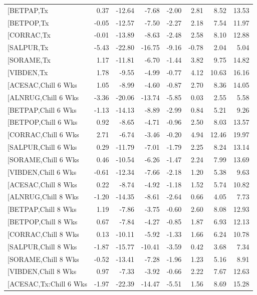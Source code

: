 \documentclass{article}\usepackage[]{graphicx}\usepackage[]{color}
\begin{document}
\begin{longtable}{lrrrrrrr}
  [BETPAP,Tx & 0.37 & -12.64 & -7.68 & -2.00 & 2.81 & 8.52 & 13.53 \\ 
  [BETPOP,Tx & -0.05 & -12.57 & -7.50 & -2.27 & 2.18 & 7.54 & 11.97 \\ 
  [CORRAC,Tx & -0.01 & -13.89 & -8.63 & -2.48 & 2.58 & 8.10 & 12.88 \\ 
  [SALPUR,Tx & -5.43 & -22.80 & -16.75 & -9.16 & -0.78 & 2.04 & 5.04 \\ 
  [SORAME,Tx & 1.17 & -11.81 & -6.70 & -1.44 & 3.82 & 9.75 & 14.82 \\ 
  [VIBDEN,Tx & 1.78 & -9.55 & -4.99 & -0.77 & 4.12 & 10.63 & 16.16 \\ 
  [ACESAC,Chill 6 Wks & 1.05 & -8.99 & -4.60 & -0.87 & 2.70 & 8.36 & 14.05 \\ 
  [ALNRUG,Chill 6 Wks & -3.36 & -20.06 & -13.74 & -5.85 & 0.03 & 2.55 & 5.58 \\ 
  [BETPAP,Chill 6 Wks & -1.13 & -14.13 & -8.89 & -2.99 & 0.84 & 5.21 & 9.26 \\ 
  [BETPOP,Chill 6 Wks & 0.92 & -8.65 & -4.71 & -0.96 & 2.50 & 8.03 & 13.57 \\ 
  [CORRAC,Chill 6 Wks & 2.71 & -6.74 & -3.46 & -0.20 & 4.94 & 12.46 & 19.97 \\ 
  [SALPUR,Chill 6 Wks & 0.29 & -11.79 & -7.01 & -1.79 & 2.25 & 8.24 & 13.14 \\ 
  [SORAME,Chill 6 Wks & 0.46 & -10.54 & -6.26 & -1.47 & 2.24 & 7.99 & 13.69 \\ 
  [VIBDEN,Chill 6 Wks & -0.61 & -12.34 & -7.66 & -2.18 & 1.20 & 5.38 & 9.63 \\ 
  [ACESAC,Chill 8 Wks & 0.22 & -8.74 & -4.92 & -1.18 & 1.52 & 5.74 & 10.82 \\ 
  [ALNRUG,Chill 8 Wks & -1.20 & -14.35 & -8.61 & -2.64 & 0.66 & 4.05 & 7.73 \\ 
  [BETPAP,Chill 8 Wks & 1.19 & -7.86 & -3.75 & -0.60 & 2.60 & 8.08 & 12.93 \\ 
  [BETPOP,Chill 8 Wks & 0.67 & -7.84 & -4.27 & -0.85 & 1.87 & 6.93 & 12.13 \\ 
  [CORRAC,Chill 8 Wks & 0.13 & -10.11 & -5.92 & -1.33 & 1.66 & 6.24 & 10.78 \\ 
  [SALPUR,Chill 8 Wks & -1.87 & -15.77 & -10.41 & -3.59 & 0.42 & 3.68 & 7.34 \\ 
  [SORAME,Chill 8 Wks & -0.52 & -13.41 & -7.28 & -1.96 & 1.23 & 5.16 & 8.91 \\ 
  [VIBDEN,Chill 8 Wks & 0.97 & -7.33 & -3.92 & -0.66 & 2.22 & 7.67 & 12.63 \\ 
  [ACESAC,Tx:Chill 6 Wks & -1.97 & -22.39 & -14.47 & -5.51 & 1.56 & 8.69 & 15.28 \\ 

\end{longtable}
\end{document}
